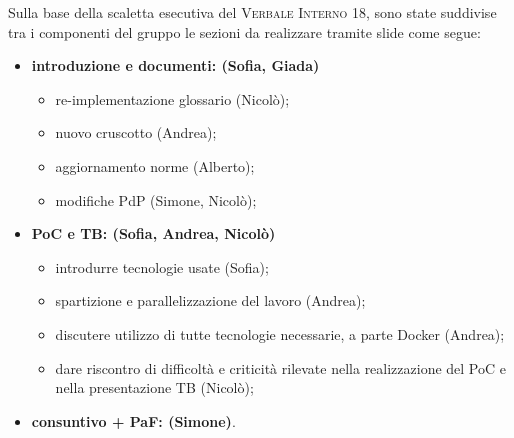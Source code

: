 Sulla base della scaletta esecutiva del \textsc{Verbale Interno 18}, sono state suddivise tra i componenti del gruppo le sezioni da realizzare tramite slide come segue:

\begin{itemize}
	\item \textbf{introduzione e documenti: (Sofia, Giada)}
	\begin{itemize}
		\item re-implementazione glossario (Nicolò);
		\item nuovo cruscotto (Andrea);
		\item aggiornamento norme (Alberto);
		\item modifiche PdP (Simone, Nicolò);
	\end{itemize}
	\item \textbf{PoC e TB: (Sofia, Andrea, Nicolò)}
	\begin{itemize}
		\item introdurre tecnologie usate (Sofia);
		\item spartizione e parallelizzazione del lavoro (Andrea);
		\item discutere utilizzo di tutte tecnologie necessarie, a parte Docker (Andrea);
		\item dare riscontro di difficoltà e criticità rilevate nella realizzazione del PoC e nella presentazione TB (Nicolò);
	\end{itemize}
	\item \textbf{consuntivo + PaF: (Simone)}.
\end{itemize}



